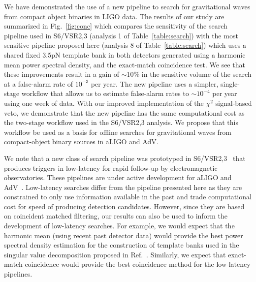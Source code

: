 \documentclass[12pt]{iopart} \usepackage{graphicx,amssymb}
\begin{document}
We have demonstrated the use of a new pipeline to search for gravitational
waves from compact object binaries in LIGO data.  The results of our study are
summarized in Fig.~\ref{fig:conc} which compares the sensitivity of the search
pipeline used in S6/VSR2,3 (analysis 1 of Table~\ref{table:search}) with the
most sensitive pipeline proposed here (analysis 8 of Table~\ref{table:search})
which uses a shared fixed 3.5pN template bank in both detectors generated using 
a harmonic mean power spectral density, and the exact-match coincidence test.  
We see that these improvements result in a gain of $\sim 10\%$ in the sensitive
volume of the search at a false-alarm rate of $10^{-3}$ per year. %
The new pipeline uses a simpler, single-stage workflow that allows us to
estimate false-alarm rates to $\sim 10^{-4}$ per year using one week of data. With our improved
implementation of the $\chi^2$ signal-based veto, we demonstrate that the new
pipeline has the same computational cost as the two-stage workflow used in the S6/VSR2,3
analysis. We propose that this workflow be used as a basis for offline
searches for gravitational waves from compact-object binary sources in aLIGO
and AdV.

We note that a new class of search pipeline was prototyped in
S6/VSR2,3~\cite{Abbott:2011ys} that produces triggers in low-latency for rapid
follow-up by electromagnetic observatories. These pipelines are under
active development for aLIGO and AdV~\cite{Adams:MBTA,Cannon:2011vi}.
Low-latency searches differ from the pipeline presented here as they are constrained to
only use information available in the past and trade computational cost for
speed of producing detection candidates. However, since they are 
based on coincident matched filtering, our results can also be
used to inform the development of low-latency searches. For example, we would expect
that the harmonic mean (using recent past detector data) would provide the best
power spectral density estimation for the construction of template banks used
in the singular value decomposition proposed in Ref.~\cite{Cannon:2011vi}.
Similarly, we expect that exact-match coincidence would provide the best
coincidence method for the low-latency pipelines.
\end{document}
